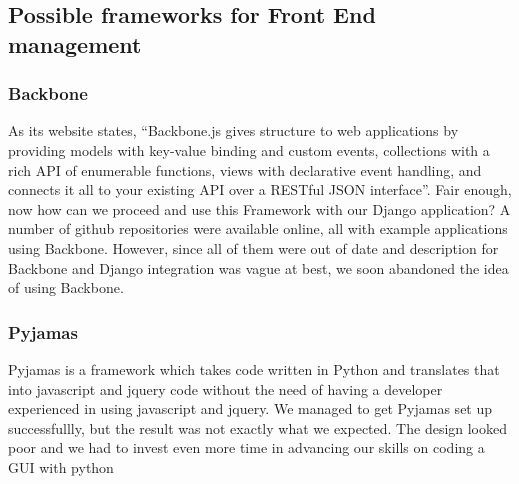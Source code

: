 \documentclass{l3proj}
\begin{document}
{\subsection{Possible frameworks for Front End management}
\subsubsection{Backbone}
As its website states, ``Backbone.js gives structure to web applications by providing 
models with key-value binding and custom events, collections with a rich API of 
enumerable functions, views with declarative event handling, and connects it all to 
your existing API over a RESTful JSON interface''. Fair enough, now how can we 
proceed and use this Framework with our Django application? A number of github 
repositories were available online, all with example applications using Backbone. 
However, since all of them were out of date and description for Backbone and 
Django integration was vague at best, we soon abandoned the idea of using 
Backbone. 
\subsubsection{Pyjamas}
Pyjamas is a framework which takes code written in Python and translates that 
into javascript and jquery code without the need of having a developer experienced 
in using javascript and jquery. We managed to get Pyjamas set up successfullly, 
but the result was not exactly what we expected. The design looked poor and we 
had to invest even more time in advancing our skills on coding a GUI with python
}
\end{document}
